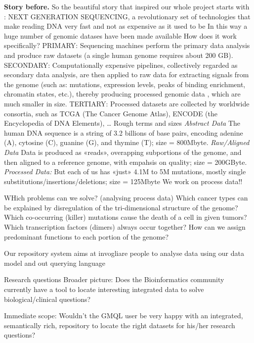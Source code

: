 \documentclass[journal]{IEEEtran}
\begin{document}
\textbf{Story before.}
So the beautiful story that inspired our whole project starts with :
NEXT GENERATION SEQUENCING, a revolutionary set of technologies that make reading DNA very fast and not as expensive as it used to be In this way a huge number of genomic datases have been made available
How does it work specifically?
PRIMARY: Sequencing machines perform the primary data analysis  and produce raw datasets (a single human genome requires about 200 GB). 
SECONDARY: Computationally expensive pipelines, collectively regarded as secondary data analysis, are then applied to raw data for extracting signals from the genome (such as: mutations,
expression levels, peaks of binding enrichment, chromatin states, etc.), thereby producing processed genomic data , which are much smaller in size.
TERTIARY: Processed datasets are collected by worldwide consortia, such as TCGA (The Cancer Genome Atlas), ENCODE (the Encyclopedia of DNA Elements), …
Rough terms and sizes
\textit{Abstract Data}
The human DNA sequence is a string of 3.2 billions of base pairs, encoding adenine (A), cytosine (C), guanine (G), and thymine (T); size = 800Mbyte.
\textit{Raw/Aligned Data} 
Data is produced as «reads», overapping subportions of the genome, and then aligned to a reference genome, with empahsis on quality; size = 200GByte. 
\textit{Processed Data:}
But each of us has «just» 4.1M to 5M mutations, mostly single substitutions/insertions/deletions; size = 125Mbyte
We work on process data!!

WHich problems can we solve? (analysing process data)
Which cancer types can be explained by disregulation of the tri-dimensional structure of the genome?
Which co-occurring (killer) mutations cause the death of a cell in given tumors?
Which transcription factors (dimers) always occur together?
How can we assign predominant functions to each portion of the genome?

Our repository system aims at invogliare people to analyse data using our data model and out querying language






Research questions
Broader picture: Does the Bioinformatics community currently have a tool to locate 
interesting integrated data 
to solve biological/clinical questions?

Immediate scope: Wouldn’t the GMQL user be very happy with an integrated, semantically rich, repository to locate the right datasets 
for his/her research questions?
\end{document}
